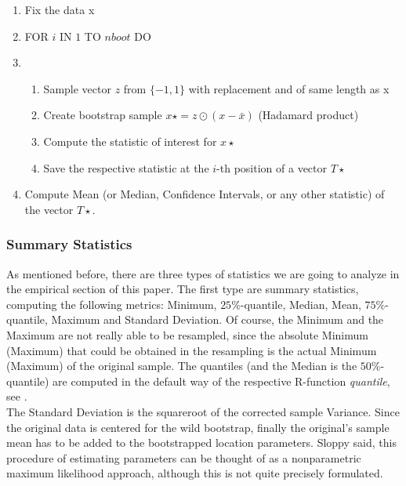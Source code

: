 \begin{enumerate}
	\item Fix the data x
	\item FOR $i$ IN $1$ TO $nboot$ DO
	\item \begin{enumerate}
		\item Sample vector $z$ from $\{-1,1\}$ with replacement and of same length as x
		\item Create bootstrap sample $x\star = z \odot (x - \bar{x})$ (Hadamard product)
		\item Compute the statistic of interest for $x\star$
		\item Save the respective statistic at the $i$-th position of a vector $T\star$
	\end{enumerate}
	\item Compute Mean (or Median, Confidence Intervals, or any other statistic) of the vector $T\star$.
\end{enumerate}
	\subsubsection*{Summary Statistics}
As mentioned before, there are three types of statistics we are going to analyze in the empirical section of this paper. The first type are summary statistics, computing the following metrics: Minimum, $25\%$-quantile, Median, Mean, $75\%$-quantile, Maximum and Standard Deviation. Of course, the Minimum and the Maximum are not really able to be resampled, since the absolute Minimum (Maximum) that could be obtained in the resampling is the actual Minimum (Maximum) of the original sample. The quantiles (and the Median is the $50\%$-quantile) are computed in the default way of the respective R-function \textit{quantile}, see \citet{r}. \\ The Standard Deviation is the squareroot of the corrected sample Variance. Since the original data is centered for the wild bootstrap, finally the original's sample mean has to be added to the bootstrapped location parameters. Sloppy said, this procedure of estimating parameters can be thought of as a nonparametric maximum likelihood approach, although this is not quite precisely formulated.

